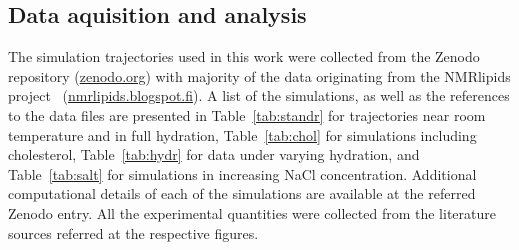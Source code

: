 \documentclass[journal=jpcbfk,manuscript=article,layout=twocolumn]{achemso}
\begin{document}

\subsection{Data aquisition and analysis}

The simulation trajectories used in this work were collected from the Zenodo repository (\url{zenodo.org}) with majority of the data originating from the NMRlipids project~\cite{botan15,catte16} (\url{nmrlipids.blogspot.fi}). A list of the simulations, as well as the references to the data files are presented in Table~\ref{tab:standr} for trajectories near room temperature and in full hydration, Table~\ref{tab:chol} for simulations including cholesterol, Table~\ref{tab:hydr} for data under varying hydration, and Table~\ref{tab:salt} for simulations in increasing NaCl concentration. Additional computational details of each of the simulations are available at the referred Zenodo entry. All the experimental quantities were collected from the literature  sources referred at the respective figures.   
\end{document}
